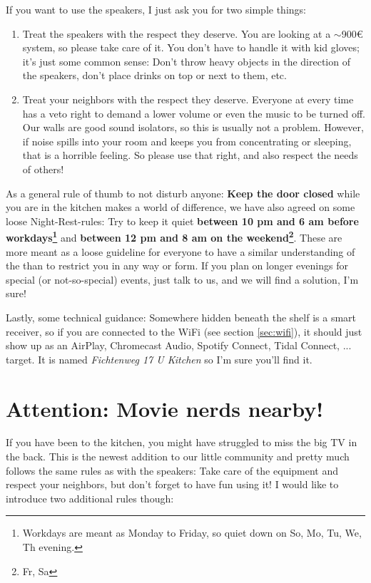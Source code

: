If you want to use the speakers, I just ask you for two simple things:
\begin{enumerate}
      \item Treat the speakers with the respect they deserve. You are looking at a $\sim$900€ system, so please take care of it. You don't have to handle it with kid gloves; it's just some common sense: Don't throw heavy objects in the direction of the speakers, don't place drinks on top or next to them, etc.
      \item Treat your neighbors with the respect they deserve. Everyone at every time has a veto right to demand a lower volume or even the music to be turned off. Our walls are good sound isolators, so this is usually not a problem. However, if noise spills into your room and keeps you from concentrating or sleeping, that is a horrible feeling. So please use that right, and also respect the needs of others!
\end{enumerate}

As a general rule of thumb to not disturb anyone: \textbf{Keep the door closed} while you are in the kitchen makes a world of difference, we have also agreed on some loose Night-Rest-rules: Try to keep it quiet \textbf{between 10 pm and 6 am before workdays\footnote{Workdays are meant as Monday to Friday, so quiet down on So, Mo, Tu, We, Th evening.}} and \textbf{between 12 pm and 8 am on the weekend\footnote{Fr, Sa}}. These  are more meant as a loose guideline for everyone to have a similar understanding of the  than to restrict you in any way or form. If you plan on longer evenings for special (or not-so-special) events, just talk to us, and we will find a solution, I'm sure!

Lastly, some technical guidance: Somewhere hidden beneath the shelf is a smart receiver, so if you are connected to the WiFi (see section \ref{sec:wifi}), it should just show up as an AirPlay, Chromecast Audio, Spotify Connect, Tidal Connect, ... target. It is named \textit{Fichtenweg 17 U Kitchen} so I'm sure you'll find it.

\section{Attention: Movie nerds nearby!}

If you have been to the kitchen, you might have struggled to miss the big TV in the back. This is the newest addition to our little community and pretty much follows the same rules as with the speakers: Take care of the equipment and respect your neighbors, but don't forget to have fun using it! I would like to introduce two additional rules though:

